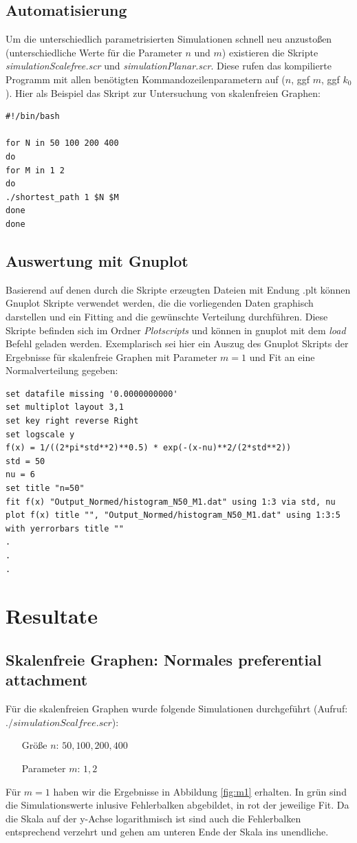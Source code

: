 \documentclass[10pt]{article}
\begin{document}
\subsection{Automatisierung}
Um die unterschiedlich parametrisierten Simulationen schnell neu anzustoßen (unterschiedliche Werte für die Parameter $n$ und $m$) existieren die Skripte \textit{simulationScalefree.scr} und \textit{simulationPlanar.scr}. Diese rufen das kompilierte Programm mit allen benötigten Kommandozeilenparametern auf ($n$, ggf $m$, ggf $k_0$). Hier als Beispiel das Skript zur Untersuchung von skalenfreien Graphen:

\begin{lstlisting}
#!/bin/bash

for N in 50 100 200 400
do
for M in 1 2
do
./shortest_path 1 $N $M
done
done
\end{lstlisting}

\subsection{Auswertung mit Gnuplot}
Basierend auf denen durch die Skripte erzeugten Dateien mit Endung .plt können Gnuplot Skripte verwendet werden, die die vorliegenden Daten graphisch darstellen und ein Fitting and die gewünschte Verteilung durchführen. Diese Skripte befinden sich im Ordner \textit{Plotscripts} und können in gnuplot mit dem \textit{load} Befehl geladen werden. Exemplarisch sei hier ein Auszug des Gnuplot Skripts der Ergebnisse für skalenfreie Graphen mit Parameter $m=1$ und Fit an eine Normalverteilung gegeben:
\begin{lstlisting}
set datafile missing '0.0000000000'
set multiplot layout 3,1
set key right reverse Right
set logscale y
f(x) = 1/((2*pi*std**2)**0.5) * exp(-(x-nu)**2/(2*std**2))
std = 50
nu = 6
set title "n=50"
fit f(x) "Output_Normed/histogram_N50_M1.dat" using 1:3 via std, nu
plot f(x) title "", "Output_Normed/histogram_N50_M1.dat" using 1:3:5 with yerrorbars title ""
.
.
.
\end{lstlisting}

\section{Resultate}
\subsection{Skalenfreie Graphen: Normales preferential attachment}
Für die skalenfreien Graphen wurde folgende Simulationen durchgeführt (Aufruf: $./simulationScalfree.scr$): 
\begin{itemize}
\item[\quad Größe $n$:] $50,100,200,400$
\item[\quad Parameter $m$:] $1,2$
\end{itemize}
Für $m=1$ haben wir die Ergebnisse in Abbildung \ref{fig:m1} erhalten. In grün sind die Simulationswerte inlusive Fehlerbalken abgebildet, in rot der jeweilige Fit. Da die Skala auf der y-Achse logarithmisch ist sind auch die Fehlerbalken entsprechend verzehrt und gehen am unteren Ende der Skala ins unendliche. 
\end{document}
